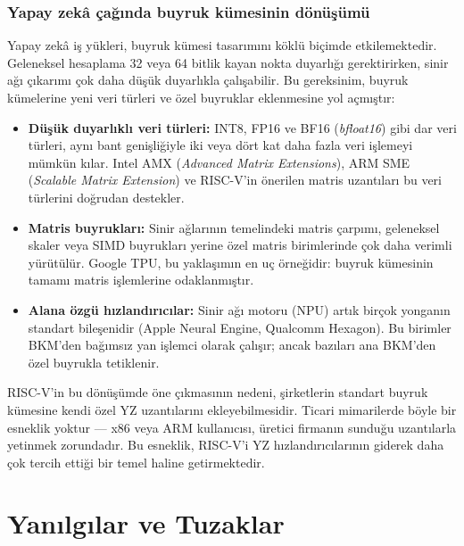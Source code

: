 \subsubsection*{Yapay zekâ çağında buyruk kümesinin dönüşümü}
Yapay zekâ iş yükleri, buyruk kümesi tasarımını köklü biçimde etkilemektedir. Geleneksel hesaplama 32 veya 64 bitlik kayan nokta duyarlığı gerektirirken, sinir ağı çıkarımı çok daha düşük duyarlıkla çalışabilir. Bu gereksinim, buyruk kümelerine yeni veri türleri ve özel buyruklar eklenmesine yol açmıştır:

\begin{itemize}[nosep]
\item \textbf{Düşük duyarlıklı veri türleri:} INT8, FP16 ve BF16 (\emph{bfloat16}) gibi dar veri türleri, aynı bant genişliğiyle iki veya dört kat daha fazla veri işlemeyi mümkün kılar. Intel AMX (\emph{Advanced Matrix Extensions}), ARM SME (\emph{Scalable Matrix Extension}) ve RISC-V'in önerilen matris uzantıları bu veri türlerini doğrudan destekler.
\item \textbf{Matris buyrukları:} Sinir ağlarının temelindeki matris çarpımı, geleneksel skaler veya SIMD buyrukları yerine özel matris birimlerinde çok daha verimli yürütülür. Google TPU, bu yaklaşımın en uç örneğidir: buyruk kümesinin tamamı matris işlemlerine odaklanmıştır.
\item \textbf{Alana özgü hızlandırıcılar:} Sinir ağı motoru (NPU) artık birçok yonganın standart bileşenidir (Apple Neural Engine, Qualcomm Hexagon). Bu birimler BKM'den bağımsız yan işlemci olarak çalışır; ancak bazıları ana BKM'den özel buyrukla tetiklenir.
\end{itemize}

RISC-V'in bu dönüşümde öne çıkmasının nedeni, şirketlerin standart buyruk kümesine kendi özel YZ uzantılarını ekleyebilmesidir. Ticari mimarilerde böyle bir esneklik yoktur --- x86 veya ARM kullanıcısı, üretici firmanın sunduğu uzantılarla yetinmek zorundadır. Bu esneklik, RISC-V'i YZ hızlandırıcılarının giderek daha çok tercih ettiği bir temel haline getirmektedir.


\section{Yanılgılar ve Tuzaklar}
\label{sec:buyruk-yanilgilar}

